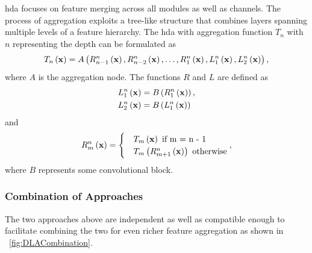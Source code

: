 \gls{hda} focuses on feature merging across all modules as well as channels. The process of aggregation exploits a tree-like structure that combines layers spanning multiple levels of a feature hierarchy. The \gls{hda} with aggregation function $T_n$ with $n$ representing the depth can be formulated as
\begin{equation}
    \label{eq:HierarchicalDeepAggregation}
    {T_n} \left( \mathbf{x} \right) =
    {A} \left( 
        {{R}_{n - 1}^{n}} \left( \mathbf{x} \right),
        {{R}_{n - 2}^{n}} \left( \mathbf{x} \right),
        \dots,
        {{R}_{1}^{n}} \left( \mathbf{x} \right),
        {{L}_{1}^{n}} \left( \mathbf{x} \right),
        {{L}_{2}^{n}} \left( \mathbf{x} \right)
     \right),
\end{equation}
where $A$ is the aggregation node. The functions $R$ and $L$ are defined as
\begin{equation}
    \label{eq:HDAConvBlocksL}
    \begin{aligned}
         & {{L}_{1}^{n}} \left( \mathbf{x} \right) = {B} \left( {{R}_{1}^{n}} \left( \mathbf{x} \right) \right), \\
         & {{L}_{2}^{n}} \left( \mathbf{x} \right) = {B} \left( {{L}_{1}^{n}} \left( \mathbf{x} \right) \right)
    \end{aligned}
\end{equation}
and
\begin{equation}
    \label{eq:DLAConvBlocksR}
    \func{\subsup{R}{m}{n}}{\vect{x}} =
    \begin{cases}
         & \func{T_m}{\vect{x}} \text{ if } $m = n - 1$                        \\
         & \func{T_m}{\func{\subsup{R}{m + 1}{n}}{\vect{x}}} \text{ otherwise}
    \end{cases},
\end{equation}
where $B$ represents some convolutional block.

\subsubsection{Combination of Approaches}

The two approaches above are independent as well as compatible enough to facilitate combining the two for even richer feature aggregation as shown in \figtext{}~\ref{fig:DLACombination}.

